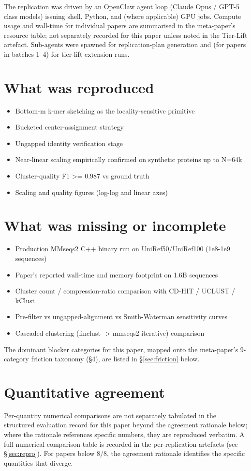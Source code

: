 \documentclass[11pt]{article}
\begin{document}
The replication was driven by an OpenClaw agent loop (Claude Opus / GPT-5 class models) issuing shell, Python, and (where applicable) GPU jobs. Compute usage and wall-time for individual papers are summarised in the meta-paper's resource table; not separately recorded for this paper unless noted in the Tier-Lift artefact. Sub-agents were spawned for replication-plan generation and (for papers in batches 1--4) for tier-lift extension runs.

\section{What was reproduced}
\begin{itemize}
\item Bottom-m k-mer sketching as the locality-sensitive primitive
\item Bucketed center-assignment strategy
\item Ungapped identity verification stage
\item Near-linear scaling empirically confirmed on synthetic proteins up to N=64k
\item Cluster-quality F1 \textgreater{}= 0.987 vs ground truth
\item Scaling and quality figures (log-log and linear axes)
\end{itemize}

\section{What was missing or incomplete}
\begin{itemize}
\item Production MMseqs2 C++ binary run on UniRef50/UniRef100 (1e8-1e9 sequences)
\item Paper's reported wall-time and memory footprint on 1.6B sequences
\item Cluster count / compression-ratio comparison with CD-HIT / UCLUST / kClust
\item Pre-filter vs ungapped-alignment vs Smith-Waterman sensitivity curves
\item Cascaded clustering (linclust -\textgreater{} mmseqs2 iterative) comparison
\end{itemize}
The dominant blocker categories for this paper, mapped onto the meta-paper's 9-category friction taxonomy (\S4), are listed in \S\ref{sec:friction} below.

\section{Quantitative agreement}
Per-quantity numerical comparisons are not separately tabulated in the structured evaluation record for this paper beyond the agreement rationale below; where the rationale references specific numbers, they are reproduced verbatim. A full numerical comparison table is recorded in the per-replication artefacts (see \S\ref{sec:repro}). For papers below 8/8, the agreement rationale identifies the specific quantities that diverge.
\end{document}
